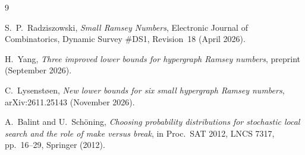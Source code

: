 \documentclass[11pt,a4paper]{article}
\begin{document}
\begin{thebibliography}{9}

S.~P.~Radziszowski,
\emph{Small Ramsey Numbers},
Electronic Journal of Combinatorics, Dynamic Survey \#DS1, Revision~18 (April 2026).

H.~Yang,
\emph{Three improved lower bounds for hypergraph Ramsey numbers},
preprint (September 2026).

C.~Lysenst\o en,
\emph{New lower bounds for six small hypergraph Ramsey numbers},
arXiv:2611.25143 (November 2026).

A.~Balint and U.~Sch\"oning,
\emph{Choosing probability distributions for stochastic local search and the role of make versus break},
in Proc.\ SAT 2012, LNCS 7317, pp.~16--29, Springer (2012).

\end{thebibliography}
\end{document}
